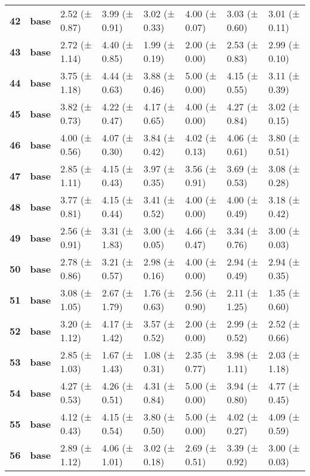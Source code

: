 \begin{longtable}{llllllll}
\cline{1-8}
\textbf{42} & \textbf{base} & 2.52 (± 0.87) & 3.99 (± 0.91) & 3.02 (± 0.33) & 4.00 (± 0.07) & 3.03 (± 0.60) & 3.01 (± 0.11) \\
\cline{1-8}
\textbf{43} & \textbf{base} & 2.72 (± 1.14) & 4.40 (± 0.85) & 1.99 (± 0.19) & 2.00 (± 0.00) & 2.53 (± 0.83) & 2.99 (± 0.10) \\
\cline{1-8}
\textbf{44} & \textbf{base} & 3.75 (± 1.18) & 4.44 (± 0.63) & 3.88 (± 0.46) & 5.00 (± 0.00) & 4.15 (± 0.55) & 3.11 (± 0.39) \\
\cline{1-8}
\textbf{45} & \textbf{base} & 3.82 (± 0.73) & 4.22 (± 0.47) & 4.17 (± 0.65) & 4.00 (± 0.00) & 4.27 (± 0.84) & 3.02 (± 0.15) \\
\cline{1-8}
\textbf{46} & \textbf{base} & 4.00 (± 0.56) & 4.07 (± 0.30) & 3.84 (± 0.42) & 4.02 (± 0.13) & 4.06 (± 0.61) & 3.80 (± 0.51) \\
\cline{1-8}
\textbf{47} & \textbf{base} & 2.85 (± 1.11) & 4.15 (± 0.43) & 3.97 (± 0.35) & 3.56 (± 0.91) & 3.69 (± 0.53) & 3.08 (± 0.28) \\
\cline{1-8}
\textbf{48} & \textbf{base} & 3.77 (± 0.81) & 4.15 (± 0.44) & 3.41 (± 0.52) & 4.00 (± 0.00) & 4.00 (± 0.49) & 3.18 (± 0.42) \\
\cline{1-8}
\textbf{49} & \textbf{base} & 2.56 (± 0.91) & 3.31 (± 1.83) & 3.00 (± 0.05) & 4.66 (± 0.47) & 3.34 (± 0.76) & 3.00 (± 0.03) \\
\cline{1-8}
\textbf{50} & \textbf{base} & 2.78 (± 0.86) & 3.21 (± 0.57) & 2.98 (± 0.16) & 4.00 (± 0.00) & 2.94 (± 0.49) & 2.94 (± 0.35) \\
\cline{1-8}
\textbf{51} & \textbf{base} & 3.08 (± 1.05) & 2.67 (± 1.79) & 1.76 (± 0.63) & 2.56 (± 0.90) & 2.11 (± 1.25) & 1.35 (± 0.60) \\
\cline{1-8}
\textbf{52} & \textbf{base} & 3.20 (± 1.12) & 4.17 (± 1.42) & 3.57 (± 0.52) & 2.00 (± 0.00) & 2.99 (± 0.52) & 2.52 (± 0.66) \\
\cline{1-8}
\textbf{53} & \textbf{base} & 2.85 (± 1.03) & 1.67 (± 1.43) & 1.08 (± 0.31) & 2.35 (± 0.77) & 3.98 (± 1.11) & 2.03 (± 1.18) \\
\cline{1-8}
\textbf{54} & \textbf{base} & 4.27 (± 0.53) & 4.26 (± 0.51) & 4.31 (± 0.84) & 5.00 (± 0.00) & 3.94 (± 0.80) & 4.77 (± 0.45) \\
\cline{1-8}
\textbf{55} & \textbf{base} & 4.12 (± 0.43) & 4.15 (± 0.54) & 3.80 (± 0.50) & 5.00 (± 0.00) & 4.02 (± 0.27) & 4.09 (± 0.59) \\
\cline{1-8}
\textbf{56} & \textbf{base} & 2.89 (± 1.12) & 4.06 (± 1.01) & 3.02 (± 0.18) & 2.69 (± 0.51) & 3.39 (± 0.92) & 3.00 (± 0.03) \\

\end{longtable}

